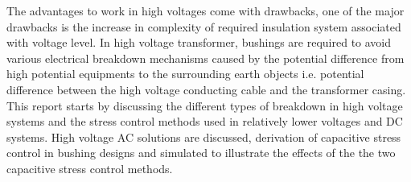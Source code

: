 The advantages to work in high voltages come with drawbacks, one of the major drawbacks is the increase in complexity of required insulation system associated with voltage level. In high voltage transformer, bushings are required to avoid various electrical breakdown mechanisms caused by the potential difference from high potential equipments to the surrounding earth objects i.e. potential difference between the high voltage conducting cable and the transformer casing. This report starts by discussing the different types of breakdown in high voltage systems and the stress control methods used in relatively lower voltages and DC systems. High voltage AC solutions are discussed, derivation of capacitive stress control in bushing designs and simulated to illustrate the effects of the the two capacitive stress control methods. 